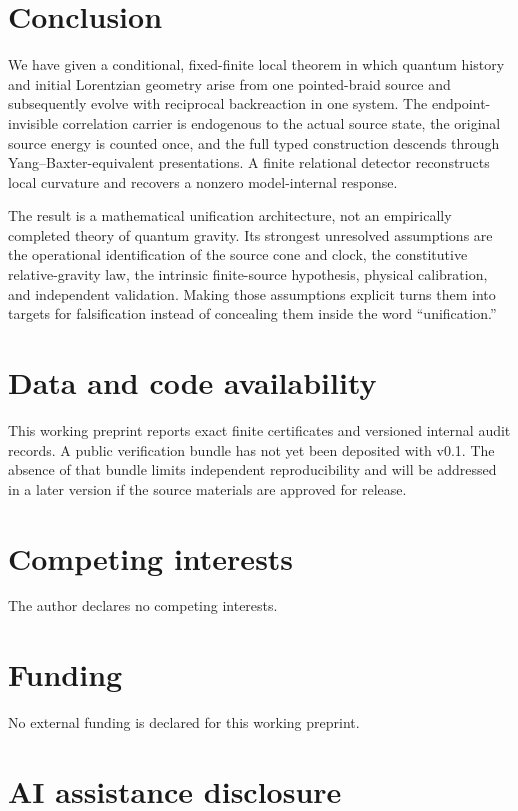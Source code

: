 \documentclass[11pt]{article}
\theoremstyle{definition}
\theoremstyle{remark}
\begin{document}
\section{Conclusion}

We have given a conditional, fixed-finite local theorem in which quantum history and initial Lorentzian geometry arise from one pointed-braid source and subsequently evolve with reciprocal backreaction in one system. The endpoint-invisible correlation carrier is endogenous to the actual source state, the original source energy is counted once, and the full typed construction descends through Yang--Baxter-equivalent presentations. A finite relational detector reconstructs local curvature and recovers a nonzero model-internal response.

The result is a mathematical unification architecture, not an empirically completed theory of quantum gravity. Its strongest unresolved assumptions are the operational identification of the source cone and clock, the constitutive relative-gravity law, the intrinsic finite-source hypothesis, physical calibration, and independent validation. Making those assumptions explicit turns them into targets for falsification instead of concealing them inside the word ``unification.''

\section*{Data and code availability}

This working preprint reports exact finite certificates and versioned internal audit records. A public verification bundle has not yet been deposited with v0.1. The absence of that bundle limits independent reproducibility and will be addressed in a later version if the source materials are approved for release.

\section*{Competing interests}

The author declares no competing interests.

\section*{Funding}

No external funding is declared for this working preprint.

\section*{AI assistance disclosure}
\end{document}
